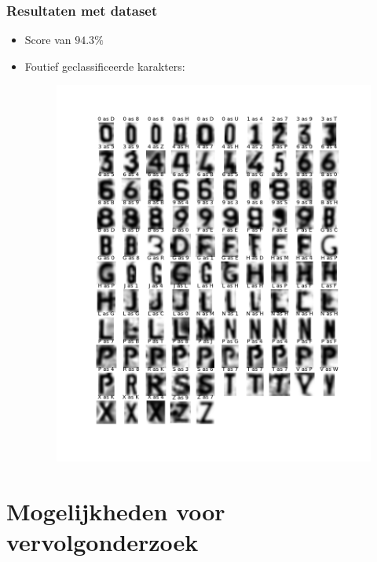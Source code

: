 \documentclass{beamer}
\begin{document}
    \begin{frame}
        \frametitle{Resultaten met dataset}

        \begin{itemize}
            \item Score van $94.3\%$
            \item Foutief geclassificeerde karakters:
            \begin{figure}
                \includegraphics[scale=.2]{faulty.png}
            \end{figure}
        \end{itemize}
    \end{frame}

    \section{Mogelijkheden voor vervolgonderzoek}
\end{document}
